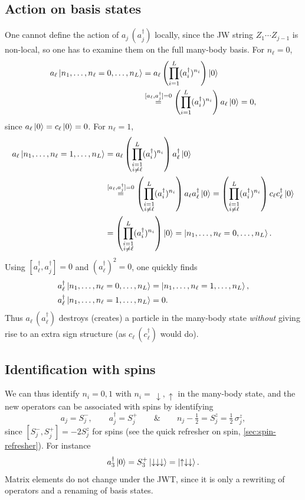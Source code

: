 \documentclass[../../main.tex]{subfiles}
\begin{document}
\subsection{Action on basis states}

One cannot define the action of $a_j\,(a_j^\dagger)$ locally, since the JW string
$Z_1\cdots Z_{j-1}$ is non-local, so one has to examine them on the full many-body basis.
For $n_\ell=0$,
\begin{align}
a_\ell\left\lvert n_1,\dots,n_\ell=0,\dots,n_L \right\rangle
&=a_\ell\left(\prod_{i=1}^{L}(a_i^\dagger)^{n_i}\right)\left\lvert 0 \right\rangle\notag\\
&\overset{[a_\ell,a_j^\dagger]=0}{=}\left(\prod_{i=1}^{L}(a_i^\dagger)^{n_i}\right)a_\ell\left\lvert 0 \right\rangle=0,
\end{align}
since $a_\ell\left\lvert 0 \right\rangle=c_\ell\left\lvert 0 \right\rangle=0$. For $n_\ell=1$,
\begin{align}
a_\ell\left\lvert n_1,\dots,n_\ell=1,\dots,n_L \right\rangle
&=a_\ell\left(\prod_{\substack{i=1\\i\neq\ell}}^{L}(a_i^\dagger)^{n_i}\right)a_\ell^\dagger\left\lvert 0 \right\rangle\notag\\
&\overset{[a_\ell,a_j^\dagger]=0}{=}
\left(\prod_{\substack{i=1\\i\neq\ell}}^{L}(a_i^\dagger)^{n_i}\right)a_\ell a_\ell^\dagger\left\lvert 0 \right\rangle
=\left(\prod_{\substack{i=1\\i\neq\ell}}^{L}(a_i^\dagger)^{n_i}\right)c_\ell c_\ell^\dagger\left\lvert 0 \right\rangle\notag\\
&=\left(\prod_{\substack{i=1\\i\neq\ell}}^{L}(a_i^\dagger)^{n_i}\right)\left\lvert 0 \right\rangle
=\left\lvert n_1,\dots,n_\ell=0,\dots,n_L \right\rangle.
\end{align}
Using $[a_\ell^\dagger,a_j^\dagger]=0$ and $(a_\ell^\dagger)^2=0$, one quickly finds
\begin{align}
a_\ell^\dagger\left\lvert n_1,\dots,n_\ell=0,\dots,n_L \right\rangle&=\left\lvert n_1,\dots,n_\ell=1,\dots,n_L \right\rangle,\\
a_\ell^\dagger\left\lvert n_1,\dots,n_\ell=1,\dots,n_L \right\rangle&=0.
\end{align}
Thus $a_\ell\,(a_\ell^\dagger)$ destroys (creates) a particle in the many-body state
\emph{without} giving rise to an extra sign structure (as $c_\ell\,(c_\ell^\dagger)$ would do).

\subsection{Identification with spins}

We can thus identify $n_i=0,1$ with $n_i=\,\downarrow,\uparrow$ in the many-body state, and the
new operators can be associated with spins by identifying
\begin{equation}
a_j=S_j^-,\qquad a_j^\dagger=S_j^+\qquad\&\qquad n_j-\tfrac12=S_j^z=\tfrac12\,\sigma_j^z,
\end{equation}
since $[S_j^-,S_j^+]=-2S_j^z$ for spins (see the quick refresher on spin,
\cref{sec:spin-refresher}). For instance
\begin{equation*}
a_3^\dagger\left\lvert 0 \right\rangle=S_3^+\left\lvert \downarrow\downarrow\downarrow \right\rangle=\left\lvert \uparrow\downarrow\downarrow \right\rangle.
\end{equation*}
Matrix elements do not change under the JWT, since it is only a rewriting of operators and a
renaming of basis states.
\end{document}
